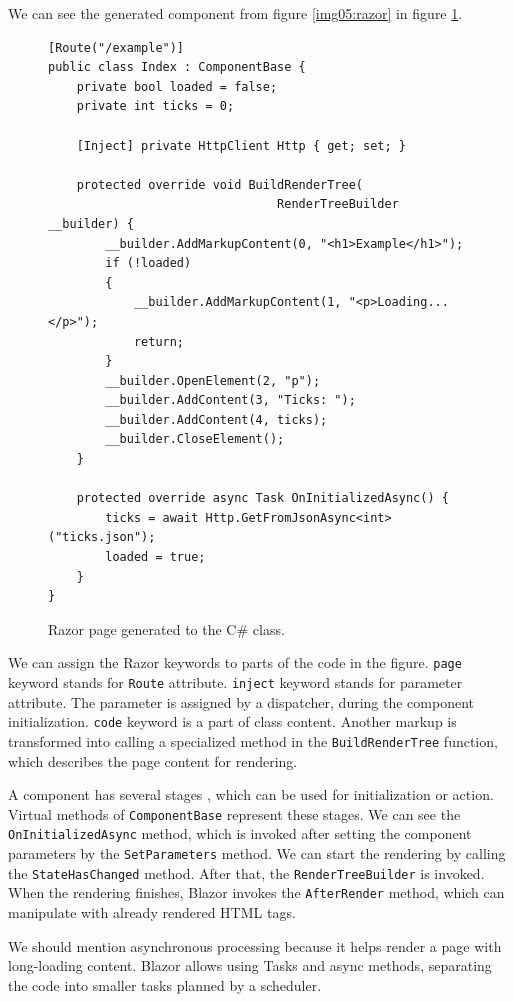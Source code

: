 We can see the generated component from figure \ref{img05:razor} in figure \ref{img06:component}.
\par
\begin{figure}
\begin{lstlisting}
[Route("/example")]
public class Index : ComponentBase {
    private bool loaded = false;
    private int ticks = 0;
	
    [Inject] private HttpClient Http { get; set; }

    protected override void BuildRenderTree(
    							RenderTreeBuilder __builder) {
        __builder.AddMarkupContent(0, "<h1>Example</h1>");
        if (!loaded)
        {
            __builder.AddMarkupContent(1, "<p>Loading...</p>");
            return;
        }
        __builder.OpenElement(2, "p");
        __builder.AddContent(3, "Ticks: ");
        __builder.AddContent(4, ticks);
        __builder.CloseElement();
    }

    protected override async Task OnInitializedAsync() {
        ticks = await Http.GetFromJsonAsync<int>("ticks.json");
        loaded = true;
    }
}
\end{lstlisting}
\caption{Razor page generated to the C\# class.}
\label{img06:component}
\end{figure}
\par
We can assign the Razor keywords to parts of the code in the figure.
\texttt{page} keyword stands for \texttt{Route} attribute.
\texttt{inject} keyword stands for parameter attribute. 
The parameter is assigned by a dispatcher, during the component initialization.
\texttt{code} keyword is a part of class content.
Another markup is transformed into calling a specialized method in the \texttt{BuildRenderTree} function, which describes the page content for rendering.
\par
A component has several stages \cite{online:lifecycle}, which can be used for initialization or action.
Virtual methods of \texttt{ComponentBase} represent these stages.
We can see the \texttt{OnInitializedAsync} method, which is invoked after setting the component parameters by the \texttt{SetParameters} method.
We can start the rendering by calling the \texttt{StateHasChanged} method.
After that, the \texttt{RenderTreeBuilder} is invoked.
When the rendering finishes, Blazor invokes the \texttt{AfterRender} method, which can manipulate with already rendered HTML tags.
\par
We should mention asynchronous processing because it helps render a page with long-loading content.
Blazor allows using Tasks and async methods, separating the code into smaller tasks planned by a scheduler.
